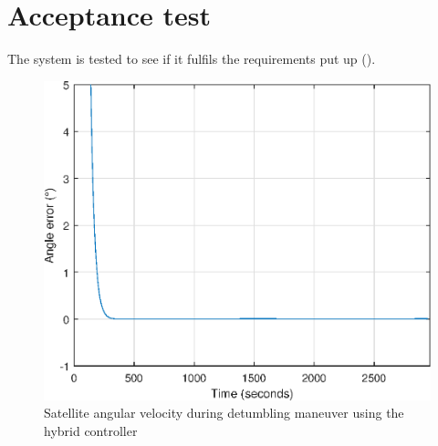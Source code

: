 \chapter{Acceptance test} \label{chap:acceptanceTest}
The system is tested to see if it fulfils the requirements put up ().

\begin{figure}[H]
	\centering
	\includegraphics[width=0.7\linewidth]{figures/angle_error}
	\caption{Satellite angular velocity during detumbling maneuver using the hybrid controller}
	\label{fig:angle_error}
\end{figure}

